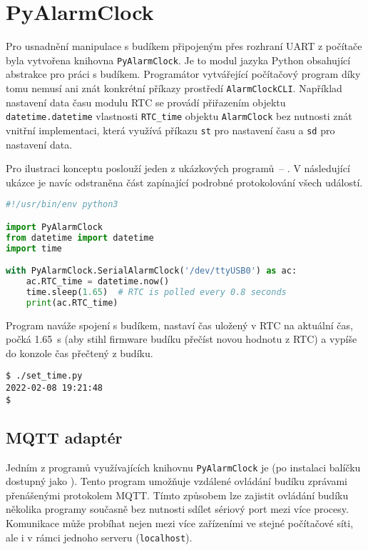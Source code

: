 \section{PyAlarmClock}
Pro usnadnění manipulace s budíkem připojeným přes rozhraní UART z počítače
byla vytvořena knihovna \texttt{PyAlarmClock}. Je to modul jazyka Python
obsahující abstrakce pro práci s budíkem. Programátor vytvářející počítačový
program díky tomu nemusí ani znát konkrétní příkazy prostředí
\texttt{AlarmClockCLI}. Například nastavení data času modulu RTC se provádí
přiřazením objektu \texttt{datetime.datetime} vlastnosti \verb|RTC_time|
objektu \texttt{AlarmClock} bez nutnosti znát vnitřní implementaci, která
využívá příkazu \texttt{st} pro nastavení času a \texttt{sd} pro nastavení
data.

Pro ilustraci konceptu poslouží jeden z ukázkových programů~--
. V následující ukázce je navíc
odstraněna část zapínající podrobné protokolování všech událostí.
\begin{lstlisting}[language=Python,style=numbers]
#!/usr/bin/env python3

import PyAlarmClock
from datetime import datetime
import time

with PyAlarmClock.SerialAlarmClock('/dev/ttyUSB0') as ac:
    ac.RTC_time = datetime.now()
    time.sleep(1.65)  # RTC is polled every 0.8 seconds
    print(ac.RTC_time)
\end{lstlisting}
Program naváže spojení s budíkem, nastaví čas uložený v RTC na aktuální čas,
počká \SI{1,65}{\second} (aby stihl firmware budíku přečíst novou hodnotu
z RTC) a vypíše do konzole čas přečtený z budíku.
\begin{lstlisting}[style=terminal]
$ ./set_time.py
2022-02-08 19:21:48
$
\end{lstlisting}


\subsection{MQTT adaptér}
Jedním z programů využívajících knihovnu \texttt{PyAlarmClock} je
 (po instalaci balíčku dostupný
jako ). Tento program umožňuje vzdálené ovládání budíku
zprávami přenášenými protokolem MQTT. Tímto způsobem lze zajistit ovládání
budíku několika programy současně bez nutnosti sdílet sériový port mezi více
procesy. Komunikace může probíhat nejen mezi více zařízeními ve stejné
počítačové síti, ale i v rámci jednoho serveru (\texttt{localhost}).

